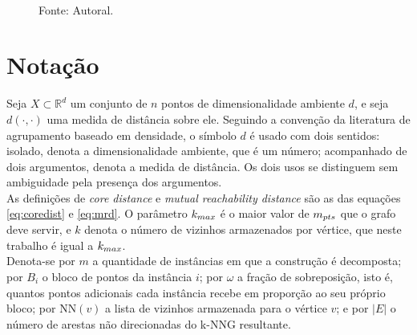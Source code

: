 \begin{figure}[htb!]
\\
Fonte: Autoral.
\end{figure}

\section{Notação\label{sec:notation}}

Seja $X \subset \mathbb{R}^d$ um conjunto de $n$ pontos de dimensionalidade ambiente $d$, e seja $d(\cdot,\cdot)$ uma medida de distância sobre ele. Seguindo a convenção da literatura de agrupamento baseado em densidade, o símbolo $d$ é usado com dois sentidos: isolado, denota a dimensionalidade ambiente, que é um número; acompanhado de dois argumentos, denota a medida de distância. Os dois usos se distinguem sem ambiguidade pela presença dos argumentos.\\

As definições de \textit{core distance} e \textit{mutual reachability distance} são as das equações \eqref{eq:coredist} e \eqref{eq:mrd}. O parâmetro $k_{max}$ é o maior valor de $m_{pts}$ que o grafo deve servir, e $k$ denota o número de vizinhos armazenados por vértice, que neste trabalho é igual a $k_{max}$.\\

Denota-se por $m$ a quantidade de instâncias em que a construção é decomposta; por $B_i$ o bloco de pontos da instância $i$; por $\omega$ a fração de sobreposição, isto é, quantos pontos adicionais cada instância recebe em proporção ao seu próprio bloco; por $\mathrm{NN}(v)$ a lista de vizinhos armazenada para o vértice $v$; e por $|E|$ o número de arestas não direcionadas do \ac{k-NNG} resultante.\\

